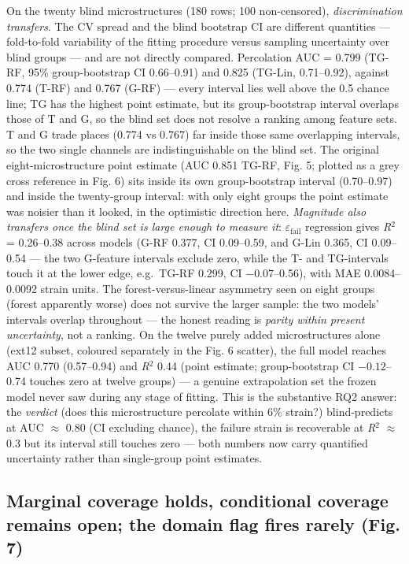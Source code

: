 \documentclass[11pt]{article}
\begin{document}
On the twenty blind microstructures (180 rows; 100 non-censored), \textit{discrimination transfers}. The CV spread and the blind bootstrap CI are different quantities --- fold-to-fold variability of the fitting procedure versus sampling uncertainty over blind groups --- and are not directly compared. Percolation AUC = 0.799 (TG-RF, 95\% group-bootstrap CI 0.66--0.91) and 0.825 (TG-Lin, 0.71--0.92), against 0.774 (T-RF) and 0.767 (G-RF) --- every interval lies well above the 0.5 chance line; TG has the highest point estimate, but its group-bootstrap interval overlaps those of T and G, so the blind set does not resolve a ranking among feature sets. T and G trade places (0.774 vs 0.767) far inside those same overlapping intervals, so the two single channels are indistinguishable on the blind set. The original eight-microstructure point estimate (AUC 0.851 TG-RF, Fig. 5; plotted as a grey cross reference in Fig. 6) sits inside its own group-bootstrap interval (0.70--0.97) and inside the twenty-group interval: with only eight groups the point estimate was noisier than it looked, in the optimistic direction here. \textit{Magnitude also transfers once the blind set is large enough to measure it}: $\varepsilon_{\mathrm{fail}}$ regression gives \textit{R}$^{2}$ = 0.26--0.38 across models (G-RF 0.377, CI 0.09--0.59, and G-Lin 0.365, CI 0.09--0.54 --- the two G-feature intervals exclude zero, while the T- and TG-intervals touch it at the lower edge, e.g.\ TG-RF 0.299, CI $-0.07$--0.56), with MAE 0.0084--0.0092 strain units. The forest-versus-linear asymmetry seen on eight groups (forest apparently worse) does not survive the larger sample: the two models' intervals overlap throughout --- the honest reading is \textit{parity within present uncertainty}, not a ranking. On the twelve purely added microstructures alone (ext12 subset, coloured separately in the Fig. 6 scatter), the full model reaches AUC 0.770 (0.57--0.94) and \textit{R}$^{2}$ 0.44 (point estimate; group-bootstrap CI $-0.12$--0.74 touches zero at twelve groups) --- a genuine extrapolation set the frozen model never saw during any stage of fitting. This is the substantive RQ2 answer: the \textit{verdict} (does this microstructure percolate within 6\% strain?) blind-predicts at AUC $\approx$ 0.80 (CI excluding chance), the failure strain is recoverable at \textit{R}$^{2}$ $\approx$ 0.3 but its interval still touches zero --- both numbers now carry quantified uncertainty rather than single-group point estimates.

\subsection{Marginal coverage holds, conditional coverage remains open; the domain flag fires rarely (Fig. 7)}
\end{document}
